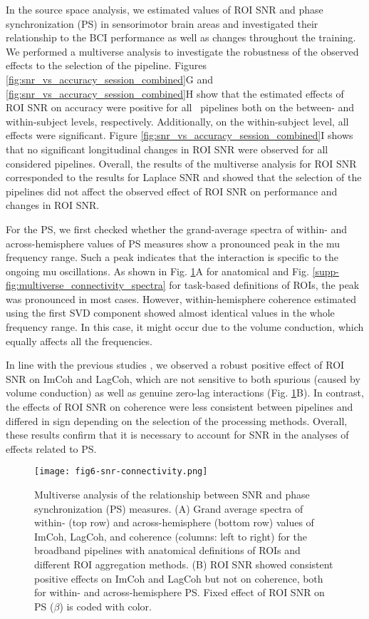 In the source space analysis, we estimated values of ROI SNR and phase synchronization (PS) in sensorimotor brain areas and investigated their relationship to the BCI performance as well as changes throughout the training. We performed a multiverse analysis to investigate the robustness of the observed effects to the selection of the pipeline. Figures \ref{fig:snr_vs_accuracy_session_combined}G and \ref{fig:snr_vs_accuracy_session_combined}H show that the estimated effects of ROI SNR on accuracy were positive for all \numPipelines~pipelines both on the between- and within-subject levels, respectively. Additionally, on the within-subject level, all effects were significant. Figure \ref{fig:snr_vs_accuracy_session_combined}I shows that no significant longitudinal changes in ROI SNR were observed for all considered pipelines. Overall, the results of the multiverse analysis for ROI SNR corresponded to the results for Laplace SNR and showed that the selection of the pipelines did not affect the observed effect of ROI SNR on performance and changes in ROI SNR.

\medskip

For the PS, we first checked whether the grand-average spectra of within- and across-hemisphere values of PS measures show a pronounced peak in the mu frequency range. Such a peak indicates that the interaction is specific to the ongoing mu oscillations. As shown in Fig. \ref{fig:snr_connectivity}A for anatomical and Fig. \ref{supp-fig:multiverse_connectivity_spectra} for task-based definitions of ROIs, the peak was pronounced in most cases. However, within-hemisphere coherence estimated using the first SVD component showed almost identical values in the whole frequency range. In this case, it might occur due to the volume conduction, which equally affects all the frequencies.

\medskip

In line with the previous studies \citep{Bayraktaroglu2013, Vidaurre2020}, we observed a robust positive effect of ROI SNR on ImCoh and LagCoh, which are not sensitive to both spurious (caused by volume conduction) as well as genuine zero-lag interactions (Fig. \ref{fig:snr_connectivity}B). In contrast, the effects of ROI SNR on coherence were less consistent between pipelines and differed in sign depending on the selection of the processing methods. Overall, these results confirm that it is necessary to account for SNR in the analyses of effects related to PS.

\begin{figure}[htbp]
    \centering
    \texttt{[image: fig6-snr-connectivity.png]}
    \caption{Multiverse analysis of the relationship between SNR and phase synchronization (PS) measures. (A) Grand average spectra of within- (top row) and across-hemisphere (bottom row) values of ImCoh, LagCoh, and coherence (columns: left to right) for the broadband pipelines with anatomical definitions of ROIs and different ROI aggregation methods. (B) ROI SNR showed consistent positive effects on ImCoh and LagCoh but not on coherence, both for within- and across-hemisphere PS. Fixed effect of ROI SNR on PS ($\beta$) is coded with color.}
    \label{fig:snr_connectivity}
\end{figure}

